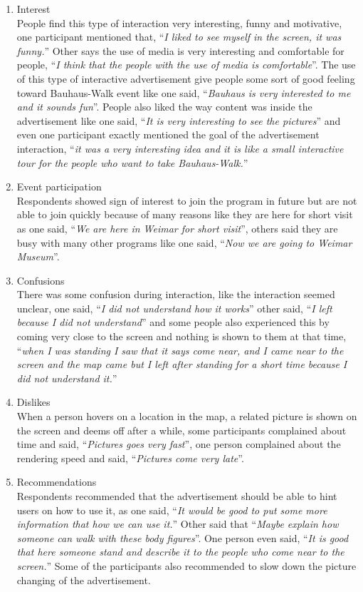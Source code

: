 \begin{enumerate}
\begin{enumerate}
\item Interest \\
    People find this type of interaction very interesting, funny and motivative, one participant mentioned that, ``\emph{I liked to see myself in the screen, it was funny.}'' Other says the use of media is very interesting and comfortable for people, ``\emph{I think that the people with the use of media is comfortable}''. The use of this type of interactive advertisement give people some sort of good feeling toward Bauhaus-Walk event like one said, ``\emph{Bauhaus is very interested to me and it sounds fun}''. People also liked the way content was inside the advertisement like one said, ``\emph{It is very interesting to see the pictures}'' and even one participant exactly mentioned the goal of the advertisement interaction, ``\emph{it was a very interesting idea and it is like a small interactive tour for the people who want to take Bauhaus-Walk.}''

\item Event participation  \\
    Respondents showed sign of interest to join the program in future but are not able to join quickly because of many reasons like they are here for short visit as one said, ``\emph{We are here in Weimar for short visit}'', others said they are busy with many other programs like one said, ``\emph{Now we are going to Weimar Museum}''.

\item Confusions \\
    There was some confusion during interaction, like the interaction seemed unclear, one said, ``\emph{I did not understand how it works}'' other said, ``\emph{I left because I did not understand}'' and some people also experienced this by coming very close to the screen and nothing is shown to them at that time, ``\emph{when I was standing I saw that it says come near, and I came near to the screen and the map came but I left after standing for a short time because I did not understand it.}''

\item Dislikes \\
    When a person hovers on a location in the map, a related picture is shown on the screen and deems off after a while, some participants complained about time and said, ``\emph{Pictures goes very fast}'', one person complained about the rendering speed and said, ``\emph{Pictures come very late}''.

\item Recommendations  \\
    Respondents recommended that the advertisement should be able to hint users on how to use it, as one said, ``\emph{It would be good to put some more information that how we can use it.}''  Other said that ``\emph{Maybe explain how someone can walk with these body figures}''. One person even said, ``\emph{It is good that here someone stand and describe it to the people who come near to the screen.}'' Some of the participants also recommended to slow down the picture changing of the advertisement.


\end{enumerate}
\end{enumerate}
